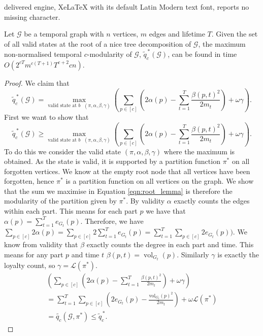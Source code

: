 \documentclass[10pt,a4paper]{amsart}
\DeclareMathOperator{\vol}{vol}
\newcommand{\cG}{\mathcal{G}}
\newcommand{\loy}{\mathcal{L}}
\begin{document}
delivered engine, XeLaTeX with its default Latin Modern text font, reports no missing character.
\begin{lemma}\label{lem:tw root}
Let $\cG$ be a temporal graph with $n$ vertices, $m$ edges and lifetime $T$.
Given the set of all valid states at the root of a nice tree decomposition of $\cG$, the maximum non-normalised temporal $c$-modularity of $\cG$, $\widetilde{q}^{\,*}_c(\cG)$, can be found in time $O(2^{cT}m^{c(T+1)}T^{c+2}cn)$. 
\end{lemma}

\begin{proof}
We claim that
\begin{equation}\label{eqn:root_lemma}
\widetilde{q}^{\,*}_c(\cG)=\max_{\text{valid state at $b$ }(\pi,\alpha,\beta,\gamma)} \left(\sum_{p \in [c]} \left( 2\alpha(p) -\sum_{t=1}^T  \frac{\beta(p,t)^2}{2m_t}\right) + \omega \gamma\right).
\end{equation}
First we want to show that 
\[\widetilde{q}^{\,*}_c(\cG)\geq\max_{\text{valid state at $b$ }(\pi,\alpha,\beta,\gamma)} \left(\sum_{p \in [c]} \left( 2\alpha(p) -\sum_{t=1}^T  \frac{\beta(p,t)^2}{2m_t}\right) + \omega \gamma\right).\]
To do this we consider the valid state $(\pi,\alpha,\beta,\gamma)$ where the maximum is obtained. As the state is valid, it is supported by a partition function $\pi^*$ on all forgotten vertices. We know at the empty root node that all vertices have been forgotten, hence $\pi^*$ is a partition function on all vertices on the graph. 
We show that the sum we maximise in Equation \ref{eqn:root_lemma} is therefore the modularity of the partition given by $\pi^*$. 
By validity $\alpha$ exactly counts the edges within each part. This means for each part $p$ we have that $\alpha(p)=\sum_{t=1}^Te_{G_t}(p)$. Therefore, we have $\sum_{p \in [c]}2\alpha(p)=\sum_{p\in[c]} 2\sum_{t=1}^T e_{G_t}(p)=\sum_{t=1}^T \sum_{p \in [c]} 2e_{G_t}(p))$.
    We know from validity that $\beta$ exactly counts the degree in each part and time. This means for any part $p$ and time $t$ $\beta(p,t)=\vol_{G_t}(p)$.
    Similarly $\gamma$ is exactly the loyalty count, so $\gamma=\loy(\pi^*)$. 
\begin{align*}
\left(\sum_{p \in [c]} \left( 2\alpha(p) -\sum_{t=1}^T  \frac{\beta(p,t)^2}{2m_t}\right) + \omega \gamma\right)\\
 =\sum_{t=1}^T \sum_{p \in [c]} \left( 2e_{G_t}(p) - \frac{\text{vol}_{G_t}(p)^2}{2m_t}\right) + \omega \loy(\pi^*)\\
=\widetilde{q_c}(\cG,\pi^*) \leq \widetilde{q}^{\,*}_c.
\end{align*}


\end{proof}
\end{document}
